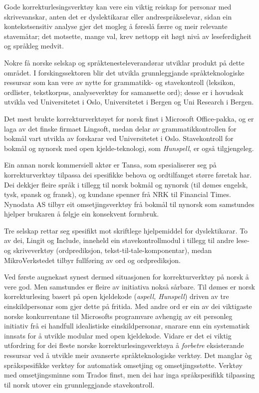 \begin{multicols}{2}

Gode korrekturlesingsverktøy kan vere ein viktig reiskap for personar med skrivevanskar, anten det er dyslektikarar eller andrespråkselevar, sidan ein kontekstsensitiv analyse gjer det mogleg å føreslå færre og meir relevante stavemåtar; det motsette, mange val, krev nettopp eit høgt nivå av leseferdigheit og språkleg medvit.

Nokre få norske selskap og språktenesteleverandørar utviklar produkt på dette området. 
I forskingssektoren blir det utvikla grunnleggjande språkteknologiske ressursar som kan vere av nytte for grammatikk- og stavekontroll (leksikon, ordlister, tekstkorpus, analyseverktøy for samansette ord); desse er i hovudsak utvikla ved Universitetet i Oslo, Universitetet i Bergen og Uni Research i Bergen. 

Det mest brukte korrekturverktøyet for norsk finst i Microsoft Office-pakka, og er laga av det finske firmaet Lingsoft, medan delar av grammatikkontrollen for bokmål vart utvikla av forskarar ved Universitetet i Oslo. Stavekontroll for bokmål og nynorsk med open kjelde-teknologi, som \textit{Hunspell}, er også tilgjengeleg. 

Ein annan norsk kommersiell aktør er Tansa, som spesialiserer seg på korrekturverktøy tilpassa dei spesifikke behova og ordtilfanget større føretak har. 
Dei dekkjer fleire språk i tillegg til norsk bokmål og nynorsk (til dømes engelsk, tysk, spansk og fransk), og kundane spenner frå NRK til Financial Times. 
Nynodata AS tilbyr eit omsetjingsverktøy frå bokmål til nynorsk som samstundes hjelper brukaren å følgje ein konsekvent formbruk. 

Tre selskap rettar seg spesifikt mot skriftlege hjelpemiddel for dyslektikarar. To av dei, Lingit og Include, inneheld ein stavekontrollmodul i tillegg til andre lese- og skriveverktøy (ordprediksjon, tekst-til-tale-komponentar), medan MikroVerkstedet tilbyr fullføring av ord og ordprediksjon. 

Ved første augnekast synest dermed situasjonen for korrekturverktøy på norsk å vere god. 
Men samstundes er fleire av initiativa nokså sårbare. 
Til dømes er norsk korrekturlesing basert på open kjeldekode (\textit{aspell, Hunspell}) driven av tre einskildpersonar som gjer dette på fritida. 
Med andre ord er ein av dei viktigaste norske konkurrentane til Microsofts programvare avhengig av eit personleg initiativ frå ei handfull idealistiske einskildpersonar, snarare enn ein systematisk innsats for å utvikle modular med open kjeldekode. 
Vidare er det ei viktig utfordring for dei fleste norske korrekturlesingsverktøya å \textit{forbetre} eksisterande ressursar ved å utvikle meir avanserte språkteknologiske verktøy. Det manglar òg språkspesifikke verktøy for automatisk omsetjing og omsetjingsstøtte. Verktøy med omsetjingsminne som Trados finst, men dei har inga språkspesifikk tilpassing til norsk utover ein grunnleggjande stavekontroll. 


\end{multicols}
